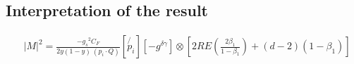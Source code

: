 
\subsection{Interpretation of the result}

\begin{equation}
\begin{split}
&|M|^{2}=\frac{-{g_s}^2 C_F}{2y (1-y)\:(p_i \cdot Q)}[\not{p_i}][-g^{\delta{{\gamma}}}]\otimes [2RE(\frac{2\beta_1}{1-\beta_1})+(d-2)(1-\beta_1)]\\
\end{split}
\end{equation}

















